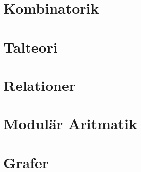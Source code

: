 \documentclass{article}
\begin{document}
	\section{Kombinatorik}

	\section{Talteori}

	\section{Relationer}

	\section{Modulär Aritmatik}

	\section{Grafer}
\end{document}
